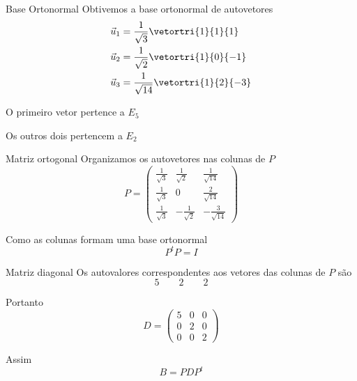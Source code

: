 \begin{resolution}{Base Ortonormal}
  Obtivemos a base ortonormal de autovetores
  \begin{align*}
      \vec{u}_{1}
      &=\frac{1}{\sqrt{3}}
      \vetortri{1}{1}{1}\\
      \vec{u}_{2}
      &=\frac{1}{\sqrt{2}}
      \vetortri{1}{0}{-1}\\
      \vec{u}_{3}
      &=\frac{1}{\sqrt{14}}
      \vetortri{1}{2}{-3}
  \end{align*}

  O primeiro vetor pertence a $E_{5}$

  Os outros dois pertencem a $E_{2}$
\end{resolution}

\begin{resolution}{Matriz ortogonal}
  Organizamos os autovetores nas colunas de $P$
  \[
      P=
      \begin{pmatrix}
          \frac{1}{\sqrt{3}} &
          \frac{1}{\sqrt{2}} &
          \frac{1}{\sqrt{14}}\\[0.2cm]
          \frac{1}{\sqrt{3}} &
          0 &
          \frac{2}{\sqrt{14}}\\[0.2cm]
          \frac{1}{\sqrt{3}} &
          -\frac{1}{\sqrt{2}} &
          -\frac{3}{\sqrt{14}}
      \end{pmatrix}
  \]

  Como as colunas formam uma base ortonormal
  \[
      P^tP=I
  \]
\end{resolution}

\begin{resolution}{Matriz diagonal}
  Os autovalores correspondentes aos vetores das colunas de $P$ são
  \[
      5\qquad 2\qquad 2
  \]

  Portanto
  \[
      D=
      \begin{pmatrix}
          5 & 0 & 0\\
          0 & 2 & 0\\
          0 & 0 & 2
      \end{pmatrix}
  \]

  Assim
  \[
      B=PDP^t
  \]
\end{resolution}

